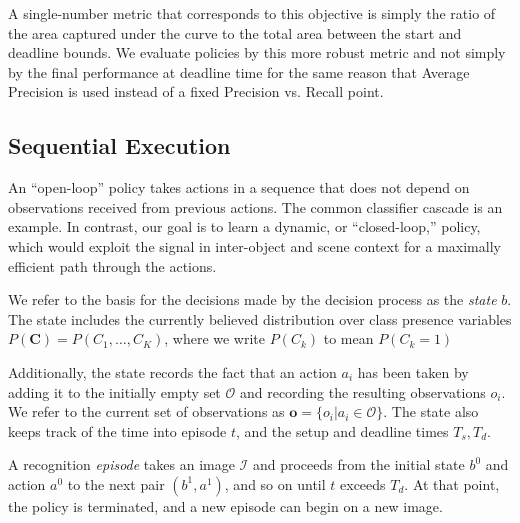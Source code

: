 A single-number metric that corresponds to this objective is simply the ratio of the area captured under the curve to the total area between the start and deadline bounds.
We evaluate policies by this more robust metric and not simply by the final performance at deadline time for the same reason that Average Precision is used instead of a fixed Precision vs. Recall point.

\subsection{Sequential Execution}
An ``open-loop'' policy takes actions in a sequence that does not depend on observations received from previous actions.
The common classifier cascade \cite{Viola2001} is an example.
In contrast, our goal is to learn a dynamic, or ``closed-loop,'' policy, which would exploit the signal in inter-object and scene context for a maximally efficient path through the actions.

We refer to the basis for the decisions made by the decision process as the \emph{state} $b$.
The state includes the currently believed distribution over class presence variables $P(\mathbf{C}) = P(C_1, \dots, C_K)$, where we write $P(C_k)$ to mean $P(C_k=1)$

Additionally, the state records the fact that an action $a_i$ has been taken by adding it to the initially empty set $\mathcal{O}$ and recording the resulting observations $o_i$.
We refer to the current set of observations as $\mathbf{o} = \{o_i | a_i \in \mathcal{O}\}$.
The state also keeps track of the time into episode $t$, and the setup and deadline times $T_s,T_d$.

A recognition \emph{episode} takes an image $\mathcal{I}$ and proceeds from the initial state $b^0$ and action $a^0$ to the next pair $(b^1,a^1)$, and so on until $t$ exceeds $T_d$.
At that point, the policy is terminated, and a new episode can begin on a new image.

